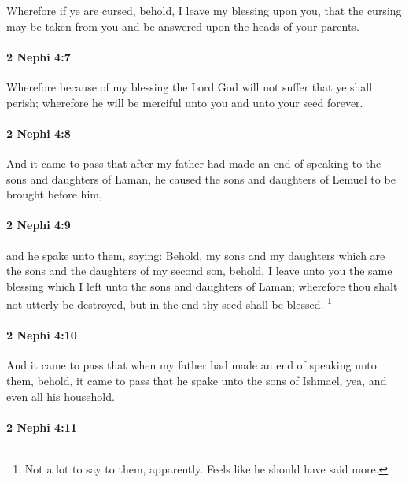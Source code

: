 			Wherefore if ye are cursed,
			behold, I leave my blessing upon you,
			that the cursing may be taken from you
			and be answered upon the heads of your parents.

		\paragraph{2 Nephi 4:7} %
			\label{2NEPHI-4-7}

			Wherefore because of my blessing
			the Lord God will not suffer that ye shall perish;
			wherefore he will be merciful unto you and unto your seed forever.

		\paragraph{2 Nephi 4:8} %
			\label{2NEPHI-4-8}

			And it came to pass that after my father had made an end of speaking
			to the sons and daughters of Laman,
			he caused the sons and daughters of Lemuel to be brought before him,

		\paragraph{2 Nephi 4:9} %
			\label{2NEPHI-4-9}

			and he spake unto them, saying:
			Behold, my sons and my daughters
			which are the sons and the daughters of my second son,
			behold, I leave unto you the same blessing
			which I left unto the sons and daughters of Laman;
			wherefore thou shalt not utterly be destroyed,
			but in the end thy seed shall be blessed.%
				\footnote{%
					\label{2NEPHI-4-9-lemuel}%
					Not a lot to say to them, apparently. Feels like he should have said more.
					}

		\paragraph{2 Nephi 4:10} %
			\label{2NEPHI-4-10}

			And it came to pass that when my father had made an end of speaking unto them,
			behold, it came to pass that he spake unto the sons of Ishmael,
			yea, and even all his household.

		\paragraph{2 Nephi 4:11} %
			\label{2NEPHI-4-11}

